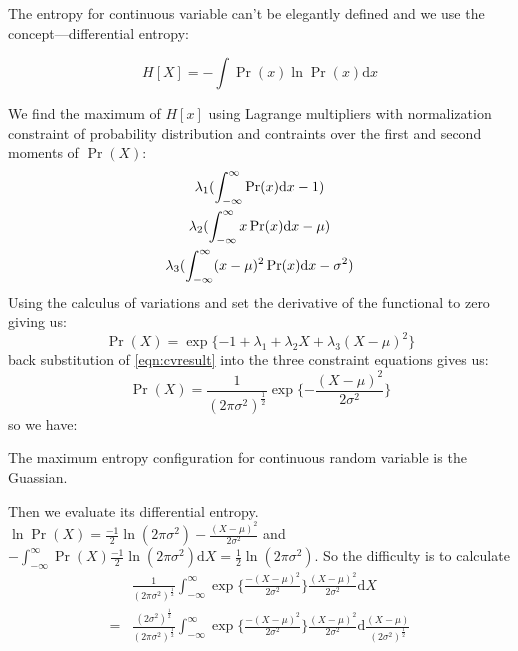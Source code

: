 The entropy for continuous variable can't be elegantly defined and we
use the concept---differential entropy:
\begin{definition}
\begin{equation}
H[X]=-\int{}\Pr(x)\ln{}\Pr(x)\text{d}x
\label{eqn:diffentropy}
\end{equation}
\end{definition}

We find the maximum of $H[x]$ using Lagrange multipliers with 
normalization constraint of probability distribution and contraints over the first and
second moments of $\Pr(X)$:
\begin{gather}
\lambda_{1}(\int_{-\infty}^{\infty}\Pr(x)\text{d}x-1)\notag\\
\lambda_{2}(\int_{-\infty}^{\infty}x\Pr(x)\text{d}x-\mu)\notag\\
\lambda_{3}(\int_{-\infty}^{\infty}(x-\mu)^{2}\Pr(x)\text{d}x-\sigma^{2})\notag
\end{gather}
Using the calculus of variations and set the derivative of the
functional to zero giving us:
\begin{equation}
\Pr(X)=\exp{}\{-1+\lambda_{1}+\lambda_{2}X+\lambda_{3}(X-\mu)^2\}
\label{eqn:cvresult}
\end{equation}
back substitution of \eqref{eqn:cvresult} into the three constraint
equations gives us:
\begin{equation}
\Pr(X)=\frac{1}{(2\pi{}\sigma^{2})^{\frac{1}{2}}}\exp{}\{-\frac{(X-\mu)^{2}}{2\sigma^{2}}\}
\label{eqn:uniguassian}
\end{equation}
so we have:
\begin{conclusion}
The maximum entropy configuration for continuous random variable is the Guassian.
\end{conclusion}
Then we evaluate its differential entropy. $\ln{}\Pr(X)=\frac{-1}{2}\ln{}(2\pi{}\sigma^2)-\frac{(X-\mu)^2}{2\sigma^2}$
    and
    $-\int_{-\infty}^{\infty}\Pr(X)\frac{-1}{2}\ln(2\pi{}\sigma^2)\text{d}X=\frac{1}{2}\ln(2\pi\sigma^2)$.
    So the difficulty is to calculate
\begin{equation}
\begin{split}
&\frac{1}{(2\pi\sigma^2)^{\frac{1}{2}}}\int_{-\infty}^{\infty}\exp{}\{\frac{-(X-\mu)^2}{2\sigma^2}\}\frac{(X-\mu)^2}{2\sigma^2}\text{d}X\\
=&\frac{(2\sigma^2)^{\frac{1}{2}}}{(2\pi\sigma^2)^{\frac{1}{2}}}\int_{-\infty}^{\infty}\exp{}\{\frac{-(X-\mu)^2}{2\sigma^2}\}\frac{(X-\mu)^2}{2\sigma^2}\text{d}\frac{(X-\mu)}{(2\sigma^2)^{\frac{1}{2}}}
\end{split}
\label{eqn:secondterm}
\end{equation}

